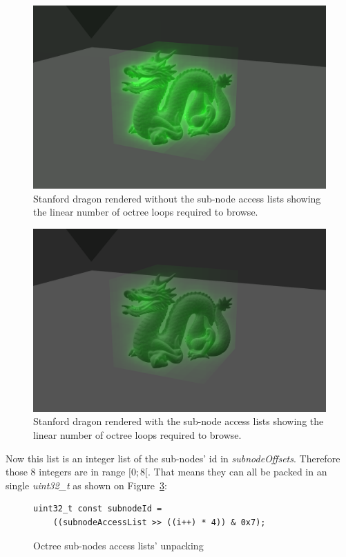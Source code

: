 \documentclass[10pt,twocolumn,a4paper]{article}
\begin{document}
\begin{figure}[h]
    \centering
    \includegraphics[width=0.8\columnwidth]{stats_octree_loops.png}
    \caption{
        Stanford dragon rendered without the sub-node access lists showing
        the linear number of octree loops required to browse.
    }
    \label{fig:stanford_dragon_without_access_list}
\end{figure}

\begin{figure}[h]
    \centering
    \includegraphics[width=0.8\columnwidth]{stats_octree_loops_optimized.png}
    \caption{
        Stanford dragon rendered with the sub-node access lists showing
        the linear number of octree loops required to browse.
    }
    \label{fig:stanford_dragon_with_access_list}
\end{figure}

Now this list is an integer list of the sub-nodes' id in
\textit{subnodeOffsets}. Therefore those 8 integers are in range $[0;8[$. That
means they can all be packed in an single \textit{uint32\_t} as shown on
Figure~\ref{code:subnode_access_unpacking}:

\begin{figure}[H]
    \centering
    \begin{lstlisting}[morekeywords={uint32_t}]
uint32_t const subnodeId =
    ((subnodeAccessList >> ((i++) * 4)) & 0x7);
    \end{lstlisting}
    \caption{Octree sub-nodes access lists' unpacking}
    \label{code:subnode_access_unpacking}
\end{figure}
\end{document}
